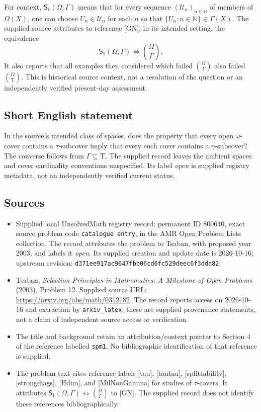 \documentclass[11pt]{article}
\newcommand{\N}{\mathbb{N}}
\begin{document}
For context, \(\mathsf S_1(\Omega,\Gamma)\) means that for every sequence \((\mathcal U_n)_{n\in\N}\) of members of \(\Omega(X)\), one can choose \(U_n\in\mathcal U_n\) for each \(n\) so that \(\{U_n:n\in\N\}\in\Gamma(X)\). The supplied source attributes to reference [GN], in its intended setting, the equivalence
\[
\mathsf S_1(\Omega,\Gamma)\Longleftrightarrow\binom{\Omega}{\Gamma}.
\]
It also reports that all examples then considered which failed \(\binom{\Omega}{\Gamma}\) also failed \(\binom{\Omega}{\mathrm T}\). This is historical source context, not a resolution of the question or an independently verified present-day assessment.
\subsection{Short English statement}
In the source's intended class of spaces, does the property that every open \(\omega\)-cover contains a \(\tau\)-subcover imply that every such cover contains a \(\gamma\)-subcover? The converse follows from \(\Gamma\subseteq\mathrm T\). The supplied record leaves the ambient spaces and cover cardinality conventions unspecified. Its label \emph{open} is supplied registry metadata, not an independently verified current status.
\subsection{Sources}
\begin{itemize}
\item Supplied local UnsolvedMath registry record: permanent ID \(800640\), exact source problem code \texttt{catalogue entry}, in the AMR Open Problem Lists collection. The record attributes the problem to Tsaban, with proposed year 2003, and labels it \emph{open}. Its supplied creation and update date is 2026-10-16; upstream revision: \texttt{d371ee917ac9647fbb06cd6fc529deec6f3dda82}.
\item Tsaban, \emph{Selection Principles in Mathematics: A Milestone of Open Problems} (2003), Problem 12. Supplied source URL: \url{https://arxiv.org/abs/math/0312182}. The record reports access on 2026-10-16 and extraction by \texttt{arxiv\_latex}; these are supplied provenance statements, not a claim of independent source access or verification.
\item The title and background retain an attribution/context pointer to Section 4 of the reference labelled \texttt{spm1}. No bibliographic identification of that reference is supplied.
\item The problem text cites reference labels [tau], [tautau], [splittability], [strongdiags], [Hdim], and [MilNonGamma] for studies of \(\tau\)-covers. It attributes \(\mathsf S_1(\Omega,\Gamma)\Longleftrightarrow\binom{\Omega}{\Gamma}\) to [GN]. The supplied record does not identify these references bibliographically.
\end{itemize}
\end{document}
